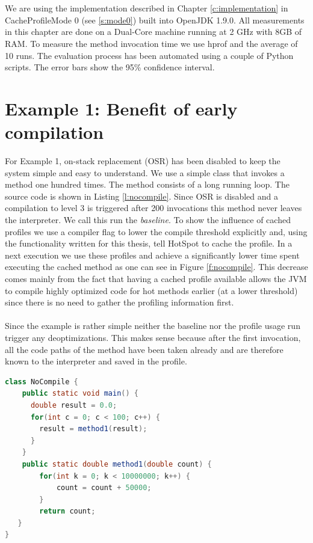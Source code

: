 \\\\
We are using the implementation described in Chapter \ref{c:implementation} in CacheProfileMode 0 (see \ref{s:mode0}) built into OpenJDK 1.9.0.
All measurements in this chapter are done on a Dual-Core machine running at 2 GHz with 8GB of RAM. To measure the method invocation time we use hprof \cite{hprof} and the average of 10 runs. The evaluation process has been automated using a couple of Python scripts. The error bars show the 95\% confidence interval.
\section{Example 1: Benefit of early compilation}
\label{s:ex1}
For Example 1, on-stack replacement (OSR) has been disabled to keep the system simple and easy to understand.
We use a simple class that invokes a method one hundred times. The method consists of a long running loop. The source code is shown in Listing \ref{l:nocompile}.
Since OSR is disabled and a compilation to level 3 is triggered after 200 invocations this method never leaves the interpreter. We call this run the \textit{baseline}.
To show the influence of cached profiles we use a compiler flag to lower the compile threshold explicitly and, using the functionality written for this thesis, tell HotSpot to cache the profile.
In a next execution we use these profiles and achieve a significantly lower time spent executing the cached method as one can see in Figure \ref{f:nocompile}.
This decrease comes mainly from the fact that having a cached profile available allows the JVM to compile highly optimized code for hot methods earlier (at a lower threshold) since there is no need to gather the profiling information first.
\\\\
Since the example is rather simple neither the baseline nor the profile usage run trigger any deoptimizations. This makes sense because after the first invocation, all the code paths of the method have been taken already and are therefore known to the interpreter and saved in the profile.
\begin{lstlisting}[float,caption=Simple method that does not get compiled,label=l:nocompile,language=Java]
class NoCompile {
    public static void main() {
      double result = 0.0;
      for(int c = 0; c < 100; c++) {
        result = method1(result);
      }
    }
    public static double method1(double count) {
        for(int k = 0; k < 10000000; k++) {
            count = count + 50000;
        }
        return count;
   }
}
\end{lstlisting}
